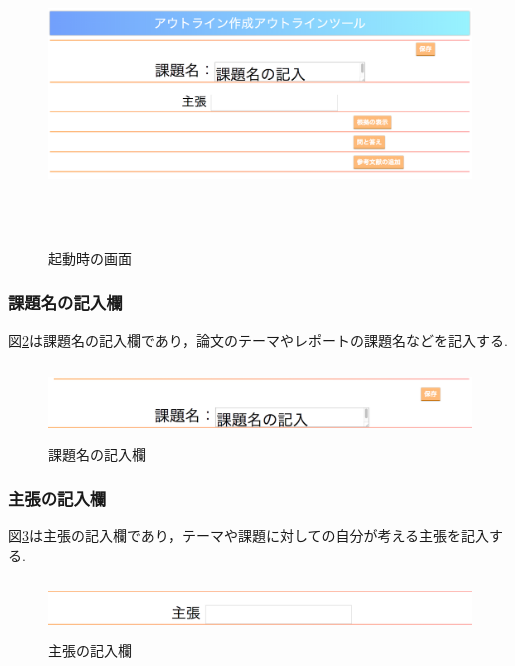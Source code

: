 \documentclass[a4j,12pt]{jarticle}
\begin{document}
\begin{figure}[h]
\begin{center}
 \includegraphics[clip,width=150mm,height=80mm]{figure/10outline.png}
\end{center}
 \caption{起動時の画面}
 \label{fig:r}
\end{figure}



\newpage
\subsubsection{課題名の記入欄}
図\ref{fig:h}は課題名の記入欄であり，論文のテーマやレポートの課題名などを記入する.
\begin{figure}[h]
\begin{center}
 \includegraphics[clip,width=150mm,height=20mm]{figure/00kadai.png}
\end{center}
 \caption{課題名の記入欄}
 \label{fig:h}
\end{figure}

\subsubsection{主張の記入欄}
図\ref{fig:i}は主張の記入欄であり，テーマや課題に対しての自分が考える主張を記入する.
\begin{figure}[h]
\begin{center}
 \includegraphics[clip,width=150mm,height=15mm]{figure/01shucho.png}
\end{center}
 \caption{主張の記入欄}
 \label{fig:i}
\end{figure}
\end{document}
